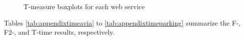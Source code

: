 \documentclass[10pt,journal,cspaper,compsoc,onecolumn]{IEEEtran}
\begin{document}
\begin{figure}
	\centering
	\caption{T-measure boxplots for each web service}
	\label{fig:appendixTmeasure}
\end{figure}


Tables \ref{tab:appendixtimeavia} to \ref{tab:appendixtimeparking} summarize the F-, F2-, and T-time results, respectively.
\end{document}
